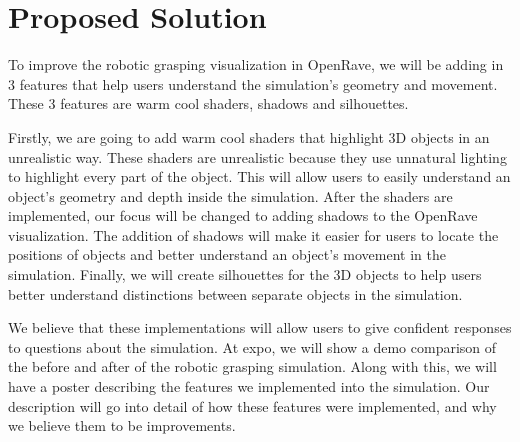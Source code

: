 \documentclass[10pt,journal,compsoc]{IEEEtran}
\begin{document}
\section{Proposed Solution}
To improve the robotic grasping visualization in OpenRave, we will be adding in 3 features that help users understand the simulation’s geometry and movement. 
These 3 features are warm cool shaders, shadows and silhouettes. \par

Firstly, we are going to add warm cool shaders that highlight 3D objects in an unrealistic way. 
These shaders are unrealistic because they use unnatural lighting to highlight every part of the object. 
This will allow users to easily understand an object’s geometry and depth inside the simulation.
After the shaders are implemented, our focus will be changed to adding shadows to the OpenRave visualization. 
The addition of shadows will make it easier for users to locate the positions of objects and better understand an object’s movement in the simulation. 
Finally, we will create silhouettes for the 3D objects to help users better understand distinctions between separate objects in the simulation. \par

We believe that these implementations will allow users to give confident responses to questions about the simulation.
At expo, we will show a demo comparison of the before and after of the robotic grasping simulation. 
Along with this, we will have a poster describing the features we implemented into the simulation. 
Our description will go into detail of how these features were implemented, and why we believe them to be improvements.
\end{document}
